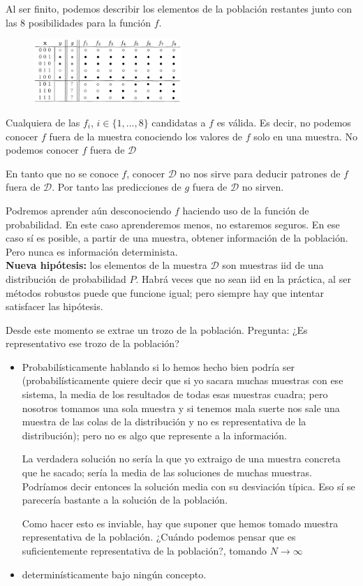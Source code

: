 \documentclass[11pt,a4paper]{article}
\theoremstyle{definition}
\begin{document}
	Al ser finito, podemos describir los elementos de la población restantes junto con las 8 posibilidades para la función $f$.
	\begin{figure}[H]
		\centering
		\includegraphics[width=0.5\textwidth]{images/learning_not_feasible3}
	\end{figure}
	
	Cualquiera de las $f_i$, $i\in \{1,\ldots,8\}$ candidatas a $f$ es válida. Es decir, no podemos conocer $f$ fuera de la muestra conociendo los valores de $f$ solo en una muestra. No podemos conocer $f$ fuera de $\mathcal{D}$
	
	En tanto que no se conoce $f$, conocer $\mathcal{D}$ no nos sirve para deducir patrones de $f$ fuera de $\mathcal{D}$. Por tanto las predicciones de $g$ fuera de $\mathcal{D}$ no sirven.
	
	Podremos aprender aún desconociendo $f$ haciendo uso de la función de probabilidad. En este caso aprenderemos menos, no estaremos seguros. En ese caso sí es posible, a partir de una muestra, obtener información de la población. Pero nunca es información determinista.\\
	
	\textbf{Nueva hipótesis:} los elementos de la muestra $\mathcal{D}$ son muestras iid de una distribución de probabilidad $P$. Habrá veces que no sean iid en la práctica, al ser métodos robustos puede que funcione igual; pero siempre hay que intentar satisfacer las hipótesis.
	
	Desde este momento se extrae un trozo de la población. Pregunta: ¿Es representativo ese trozo de la población?
	\begin{itemize}
	\item Probabilísticamente hablando si lo hemos hecho bien podría ser (probabilísticamente quiere decir que si yo sacara muchas muestras con ese sistema, la media de los resultados de todas esas muestras cuadra; pero nosotros tomamos una sola muestra y si tenemos mala suerte nos sale una muestra de las colas de la distribución y no es representativa de la distribución); pero no es algo que represente a la información. 
	
	La verdadera solución no sería la que yo extraigo de una muestra concreta que he sacado; sería la media de las soluciones de muchas muestras. Podríamos decir entonces la solución media con su desviación típica. Eso sí se parecería bastante a la solución de la población.
	
	Como hacer esto es inviable, hay que suponer que hemos tomado muestra representativa de la población. ¿Cuándo podemos pensar que es suficientemente representativa de la población?, tomando $N\to \infty$
	\item  determinísticamente bajo ningún concepto.
	
	\end{itemize}
	
\end{document}
